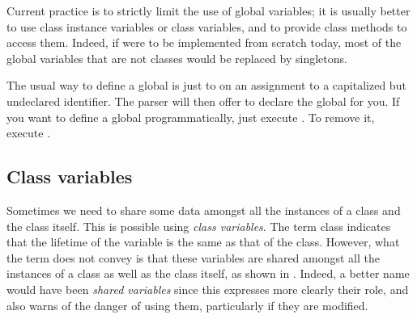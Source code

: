 \documentclass[a4paper,10pt,twoside]{book}
\begin{document}
Current practice is to strictly limit the use of global variables; it is usually better to use class instance variables or class variables, and to provide class methods to access them.  Indeed, if \pharo were to be implemented from scratch today, most of the global variables that are not classes would be replaced by singletons.

The usual way to define a global is just to  on an assignment to a capitalized but undeclared identifier.  The parser will then offer to declare the global for you.  If you want to define a global programmatically, just execute .  To remove it, execute .

\subsection{Class variables}
\label{sec:classVars}

Sometimes we need to share some data amongst all the instances of a 
class and the class itself.
This is possible using \emph{class variables}. 
The term class  indicates that the lifetime of the variable is the same as that of the class. However, what the
term does not convey is that these variables are shared amongst all the instances of a class as well as the class itself,
as shown in .
Indeed, a better name would have been \emph{shared variables} since this expresses more clearly their role, and also warns of the danger of using them, particularly if they are modified.
\end{document}
